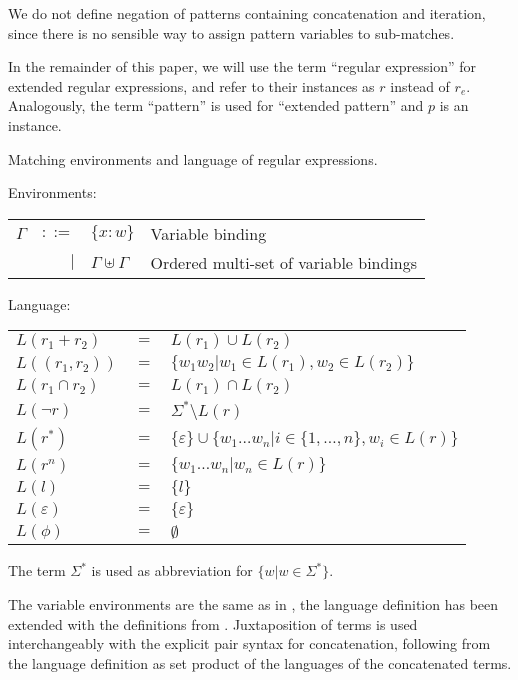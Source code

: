 We do not define negation of patterns containing concatenation and iteration,
since there is no sensible way to assign pattern variables to sub-matches.

In the remainder of this paper, we will use the term ``regular expression''
for extended regular expressions, and refer to their instances as $r$ instead
of $r_e$.  Analogously, the term ``pattern'' is used for ``extended pattern''
and $p$ is an instance.

\begin{defn}
   \label{defn-lang}
   Matching environments and language of regular expressions.

   Environments:

   \begin{tabular}{lrll}
      $\Gamma$	& $::=$	& $\{x:w\}$			& Variable binding	\\
		& $|$	& $\Gamma \uplus \Gamma$	& Ordered multi-set of
							  variable bindings	\\
   \end{tabular}

   Language:

   \begin{tabular}{lll}
      $L(r_1 + r_2)$	& $=$	& $L(r_1) \cup L(r_2)$					\\
      $L((r_1, r_2))$	& $=$	& $\{ w_1w_2 | w_1 \in L(r_1), w_2 \in L(r_2) \}$	\\
      $L(r_1 \cap r_2)$	& $=$	& $L(r_1) \cap L(r_2)$					\\
      $L(\neg r)$	& $=$	& $\Sigma^* \setminus L(r)$				\\
      $L(r^*)$		& $=$	&
         $\{\varepsilon\} \cup \{ w_1 \dots w_n | i
         \in \{ 1, \dots, n \}, w_i \in L(r) \}$	\\
      $L(r^n)$		& $=$	&
         $\{ w_1 \dots w_n | w_n \in L(r) \}$	\\
      $L(l)$		& $=$	& $\{l\}$						\\
      $L(\varepsilon)$	& $=$	& $\{\varepsilon\}$					\\
      $L(\phi)$		& $=$	& $\emptyset$						\\
   \end{tabular}
\end{defn}


The term $\Sigma^*$ is used as abbreviation for $\{ w | w \in \Sigma^* \}$.

The variable environments are the same as in \cite{pdpat}, the language
definition has been extended with the definitions from \cite{pdere}.
Juxtaposition of terms is used interchangeably with the explicit pair syntax
for concatenation, following from the language definition as set product of
the languages of the concatenated terms.


